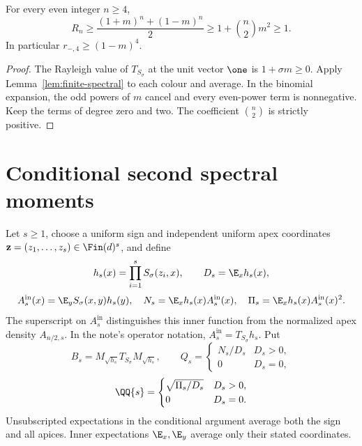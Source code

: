 \begin{lemma}
\label{lem:finite-even-cycle}
\proved For every even integer $n\ge4$,
\[
 R_n\ge\frac{(1+m)^n+(1-m)^n}{2}
 \ge1+\binom n2m^2\ge1.
\]
In particular $r_{-,4}\ge(1-m)^4$.
\end{lemma}
\begin{proof}
The Rayleigh value of $T_{S_\sigma}$ at the unit vector $\one$ is $1+\sigma m\ge0$.
Apply Lemma~\ref{lem:finite-spectral} to each colour and average.  In the binomial
expansion, the odd powers of $m$ cancel and every even-power term is nonnegative.
Keep the terms of degree zero and two.  The coefficient $\binom n2$ is strictly positive.
\end{proof}

\section{Conditional second spectral moments}
\label{sec:conditional}

\begin{definition}
\label{def:conditional}
Let $s\ge1$, choose a uniform sign and independent uniform apex coordinates
$\mathbf z=(z_1,\ldots,z_s)\in\Fin(d)^s$, and define
\[
 h_s(x)=\prod_{i=1}^s S_\sigma(z_i,x),\qquad D_s=\E_x h_s(x),
\]
\[
 A_s^{\mathrm{in}}(x)=\E_y S_\sigma(x,y)h_s(y),\quad
 N_s=\E_x h_s(x)A_s^{\mathrm{in}}(x),\quad
 \Pi_s=\E_x h_s(x)A_s^{\mathrm{in}}(x)^2.
\]
The superscript on $A_s^{\mathrm{in}}$ distinguishes this inner function from the normalized
apex density $A_{n/2,s}$.  In the note's operator notation,
$A_s^{\mathrm{in}}=T_{S_\sigma}h_s$.
Put
\[
 B_s=M_{\sqrt{h_s}}T_{S_\sigma}M_{\sqrt{h_s}},\qquad
 Q_s=\begin{cases}N_s/D_s&D_s>0,\\0&D_s=0,\end{cases}
\]
\[
 \QQ{s}=\begin{cases}\sqrt{\Pi_s/D_s}&D_s>0,\\0&D_s=0.\end{cases}
\]
Unsubscripted expectations in the conditional argument average both the sign and all
apices.  Inner expectations $\E_x,\E_y$ average only their stated coordinates.
\end{definition}

